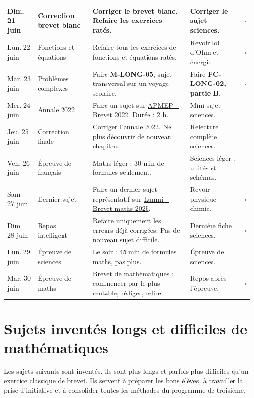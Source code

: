 \begin{longtable}{|p{2.3cm}|p{3.2cm}|p{4.7cm}|p{4.7cm}|p{0.7cm}|}
\hline
Dim. 21 juin & Correction brevet blanc & Corriger le brevet blanc. Refaire les exercices ratés. & Corriger le sujet sciences. & $\square$ \\
\hline
Lun. 22 juin & Fonctions et équations & Refaire tous les exercices de fonctions et équations ratés. & Revoir loi d'Ohm et énergie. & $\square$ \\
\hline
Mar. 23 juin & Problèmes complexes & Faire \textbf{M-LONG-05}, sujet transversal sur un voyage scolaire. & Faire \textbf{PC-LONG-02, partie B}. & $\square$ \\
\hline
Mer. 24 juin & Annale 2022 & Faire un sujet sur \href{https://www.apmep.fr/Brevet-2022}{APMEP -- Brevet 2022}. Durée : 2 h. & Mini-sujet sciences. & $\square$ \\
\hline
Jeu. 25 juin & Correction finale & Corriger l'annale 2022. Ne plus découvrir de nouveau chapitre. & Relecture complète sciences. & $\square$ \\
\hline
Ven. 26 juin & Épreuve de français & Maths léger : 30 min de formules seulement. & Sciences léger : unités et schémas. & $\square$ \\
\hline
Sam. 27 juin & Dernier sujet & Faire un dernier sujet représentatif sur \href{https://www.lumni.fr/article/maths-sujets-et-corriges-serie-generale-brevet-2025}{Lumni -- Brevet maths 2025}. & Revoir physique-chimie. & $\square$ \\
\hline
Dim. 28 juin & Repos intelligent & Refaire uniquement les erreurs déjà corrigées. Pas de nouveau sujet difficile. & Dernière fiche sciences. & $\square$ \\
\hline
Lun. 29 juin & Épreuve de sciences & Le soir : 45 min de formules maths, pas plus. & Épreuve de sciences. & $\square$ \\
\hline
Mar. 30 juin & Épreuve de maths & Brevet de mathématiques : commencer par le plus rentable, rédiger, relire. & Repos après l'épreuve. & $\square$ \\
\hline
\end{longtable}

\newpage

\section{Sujets inventés longs et difficiles de mathématiques}

\begin{attention}
Les sujets suivants sont inventés. Ils sont plus longs et parfois plus difficiles qu'un exercice classique de brevet. 
Ils servent à préparer les bons élèves, à travailler la prise d'initiative et à consolider toutes les méthodes du programme de troisième.
\end{attention}

